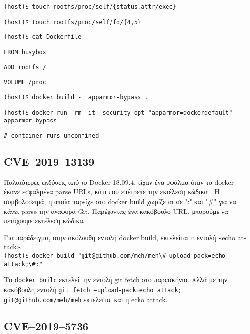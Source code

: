 \texttt{\textlatin{(host)\$ touch rootfs/proc/self/\{status,attr/exec\}}}

\texttt{\textlatin{(host)\$ touch rootfs/proc/self/fd/\{4,5\}}}

\texttt{\textlatin{(host)\$ cat Dockerfile}}

\texttt{\textlatin{FROM busybox}}

\texttt{\textlatin{ADD rootfs /}}

\texttt{\textlatin{}}

\texttt{\textlatin{VOLUME /proc}}

\texttt{\textlatin{(host)\$ docker build -t apparmor-bypass .}}

\texttt{\textlatin{(host)\$ docker run --rm -it --security-opt "apparmor=dockerdefault" apparmor-bypass}}

\texttt{\textlatin{\# container runs unconfined}}

\subsection{\textlatin{CVE–2019–13139}}

Παλαιότερες εκδόσεις από το \textlatin{Docker} 18.09.4, είχαν ένα σφάλμα όταν το
\textlatin{docker} έκανε εσφαλμένα \textlatin{parse URLs}, κάτι που επέτρεπε την
εκτέλεση κώδικα \cite{CVE-2019-13139-STAALDRAAD}. Η συμβολοσειρά, η οποία
παρείχε στο \textlatin{docker build} χωρίζεται σε ":" και "\#" για να κάνει
\textlatin{parse} την αναφορά \textlatin{Git}. Παρέχοντας ένα κακόβουλο
\textlatin{URL}, μπορούμε να πετύχουμε εκτέλεση κώδικα.


Για παράδειγμα, στην ακόλουθη εντολή \textlatin{docker build}, εκτελείται η
εντολή «\textlatin{echo attack}». \\

\texttt{\textlatin{(host)\$ docker build "git@github.com/meh/meh\textbackslash \#--upload-pack=echo attack;\textbackslash \#:"}}

Το \texttt{\textlatin{docker build}} εκτελεί την εντολή \textlatin{git fetch}
στο παρασκήνιο. Αλλά με την κακόβουλη εντολή \texttt{\textlatin{git fetch
--upload-pack=echo attack; git@github.com/meh/meh}} εκτελείται και η 
\textlatin{echo attack}.

\subsection{\textlatin{CVE–2019–5736}}

